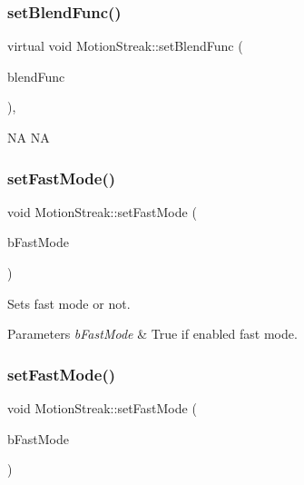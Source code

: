 \subsubsection{\texorpdfstring{set\+Blend\+Func()}{setBlendFunc()}\hspace{0.1cm}{\footnotesize\ttfamily [2/2]}}
{\footnotesize\ttfamily virtual void Motion\+Streak\+::set\+Blend\+Func (\begin{DoxyParamCaption}\item[{const \hyperlink{structBlendFunc}{Blend\+Func} \&}]{blend\+Func }\end{DoxyParamCaption})\hspace{0.3cm}{\ttfamily [override]}, {\ttfamily [virtual]}}

NA  NA \mbox{\label{classMotionStreak_ac05305e418ee7cf9573cb373b651140f}} 
\subsubsection{\texorpdfstring{set\+Fast\+Mode()}{setFastMode()}\hspace{0.1cm}{\footnotesize\ttfamily [1/2]}}
{\footnotesize\ttfamily void Motion\+Streak\+::set\+Fast\+Mode (\begin{DoxyParamCaption}\item[{bool}]{b\+Fast\+Mode }\end{DoxyParamCaption})\hspace{0.3cm}{\ttfamily [inline]}}

Sets fast mode or not.


\begin{DoxyParams}{Parameters}
{\em b\+Fast\+Mode} & True if enabled fast mode. \\
\hline
\end{DoxyParams}
\mbox{\label{classMotionStreak_ac05305e418ee7cf9573cb373b651140f}} 
\subsubsection{\texorpdfstring{set\+Fast\+Mode()}{setFastMode()}\hspace{0.1cm}{\footnotesize\ttfamily [2/2]}}
{\footnotesize\ttfamily void Motion\+Streak\+::set\+Fast\+Mode (\begin{DoxyParamCaption}\item[{bool}]{b\+Fast\+Mode }\end{DoxyParamCaption})\hspace{0.3cm}{\ttfamily [inline]}}

